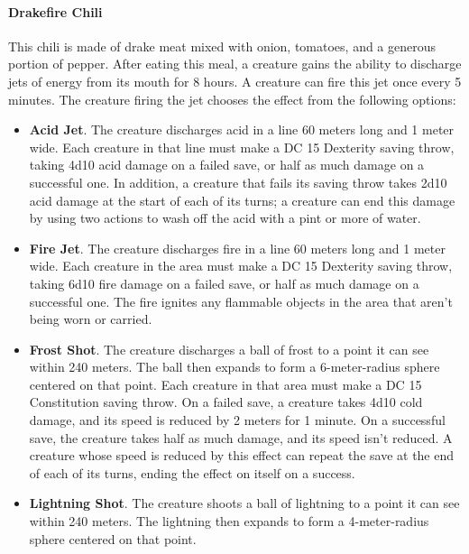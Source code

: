     \paragraph{Drakefire Chili}
        This chili is made of drake meat mixed with onion, tomatoes, and a generous portion of pepper.
        After eating this meal, a creature gains the ability to discharge jets of energy from its mouth for 8 hours.
        A creature can fire this jet once every 5 minutes.
        The creature firing the jet chooses the effect from the following options:
        \begin{itemize}
            \item \textbf{Acid Jet}.
                The creature discharges acid in a line 60 meters long and 1 meter wide.
                Each creature in that line must make a DC 15 Dexterity saving throw, taking 4d10 acid damage on a failed save, or half as much damage on a successful one.
                In addition, a creature that fails its saving throw takes 2d10 acid damage at the start of each of its turns; a creature can end this damage by using two actions to wash off the acid with a pint or more of water.
            \item \textbf{Fire Jet}.
                The creature discharges fire in a line 60 meters long and 1 meter wide.
                Each creature in the area must make a DC 15 Dexterity saving throw, taking 6d10 fire damage on a failed save, or half as much damage on a successful one.
                The fire ignites any flammable objects in the area that aren't being worn or carried.
            \item \textbf{Frost Shot}.
                The creature discharges a ball of frost to a point it can see within 240 meters.
                The ball then expands to form a 6-meter-radius sphere centered on that point.
                Each creature in that area must make a DC 15 Constitution saving throw.
                On a failed save, a creature takes 4d10 cold damage, and its speed is reduced by 2 meters for 1 minute.
                On a successful save, the creature takes half as much damage, and its speed isn't reduced.
                A creature whose speed is reduced by this effect can repeat the save at the end of each of its turns, ending the effect on itself on a success.
            \item \textbf{Lightning Shot}.
                The creature shoots a ball of lightning to a point it can see within 240 meters.
                The lightning then expands to form a 4-meter-radius sphere centered on that point.

\end{itemize}

